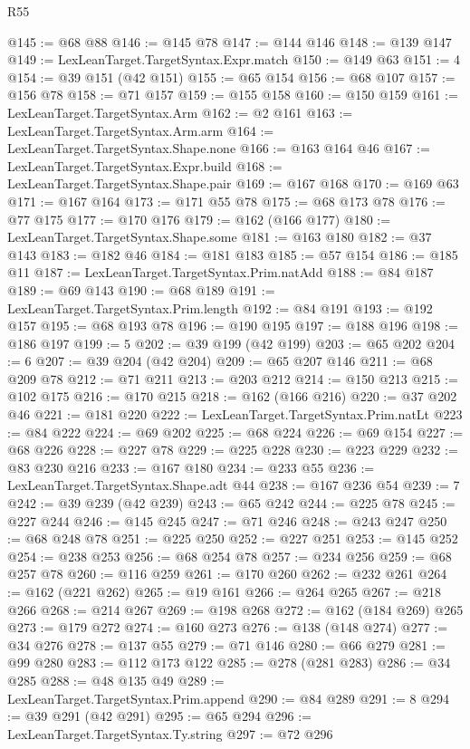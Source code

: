 \begin{lexlean}{R55}
\begin{coremodule}
@145 := @68 @88
@146 := @145 @78
@147 := @144 @146
@148 := @139 @147
@149 := LexLeanTarget.TargetSyntax.Expr.match
@150 := @149 @63
@151 := 4
@154 := @39 @151 (@42 @151)
@155 := @65 @154
@156 := @68 @107
@157 := @156 @78
@158 := @71 @157
@159 := @155 @158
@160 := @150 @159
@161 := LexLeanTarget.TargetSyntax.Arm
@162 := @2 @161
@163 := LexLeanTarget.TargetSyntax.Arm.arm
@164 := LexLeanTarget.TargetSyntax.Shape.none
@166 := @163 @164 @46
@167 := LexLeanTarget.TargetSyntax.Expr.build
@168 := LexLeanTarget.TargetSyntax.Shape.pair
@169 := @167 @168
@170 := @169 @63
@171 := @167 @164
@173 := @171 @55 @78
@175 := @68 @173 @78
@176 := @77 @175
@177 := @170 @176
@179 := @162 (@166 @177)
@180 := LexLeanTarget.TargetSyntax.Shape.some
@181 := @163 @180
@182 := @37 @143
@183 := @182 @46
@184 := @181 @183
@185 := @57 @154
@186 := @185 @11
@187 := LexLeanTarget.TargetSyntax.Prim.natAdd
@188 := @84 @187
@189 := @69 @143
@190 := @68 @189
@191 := LexLeanTarget.TargetSyntax.Prim.length
@192 := @84 @191
@193 := @192 @157
@195 := @68 @193 @78
@196 := @190 @195
@197 := @188 @196
@198 := @186 @197
@199 := 5
@202 := @39 @199 (@42 @199)
@203 := @65 @202
@204 := 6
@207 := @39 @204 (@42 @204)
@209 := @65 @207 @146
@211 := @68 @209 @78
@212 := @71 @211
@213 := @203 @212
@214 := @150 @213
@215 := @102 @175
@216 := @170 @215
@218 := @162 (@166 @216)
@220 := @37 @202 @46
@221 := @181 @220
@222 := LexLeanTarget.TargetSyntax.Prim.natLt
@223 := @84 @222
@224 := @69 @202
@225 := @68 @224
@226 := @69 @154
@227 := @68 @226
@228 := @227 @78
@229 := @225 @228
@230 := @223 @229
@232 := @83 @230 @216
@233 := @167 @180
@234 := @233 @55
@236 := LexLeanTarget.TargetSyntax.Shape.adt @44
@238 := @167 @236 @54
@239 := 7
@242 := @39 @239 (@42 @239)
@243 := @65 @242
@244 := @225 @78
@245 := @227 @244
@246 := @145 @245
@247 := @71 @246
@248 := @243 @247
@250 := @68 @248 @78
@251 := @225 @250
@252 := @227 @251
@253 := @145 @252
@254 := @238 @253
@256 := @68 @254 @78
@257 := @234 @256
@259 := @68 @257 @78
@260 := @116 @259
@261 := @170 @260
@262 := @232 @261
@264 := @162 (@221 @262)
@265 := @19 @161
@266 := @264 @265
@267 := @218 @266
@268 := @214 @267
@269 := @198 @268
@272 := @162 (@184 @269) @265
@273 := @179 @272
@274 := @160 @273
@276 := @138 (@148 @274)
@277 := @34 @276
@278 := @137 @55
@279 := @71 @146
@280 := @66 @279
@281 := @99 @280
@283 := @112 @173 @122
@285 := @278 (@281 @283)
@286 := @34 @285
@288 := @48 @135 @49
@289 := LexLeanTarget.TargetSyntax.Prim.append
@290 := @84 @289
@291 := 8
@294 := @39 @291 (@42 @291)
@295 := @65 @294
@296 := LexLeanTarget.TargetSyntax.Ty.string
@297 := @72 @296

\end{coremodule}
\end{lexlean}
